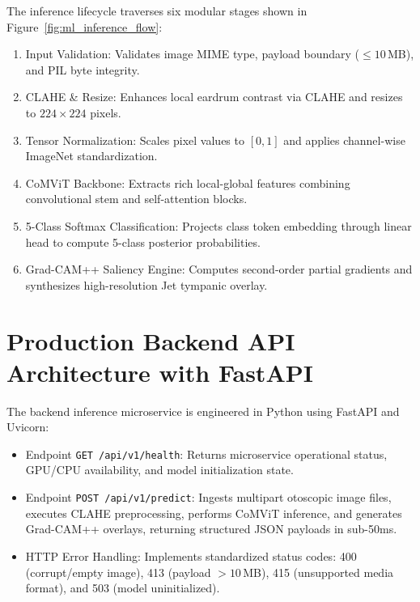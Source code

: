 \documentclass[12pt,a4paper]{report}
\renewcommand{\textbf}[1]{#1}
\begin{document}
The inference lifecycle traverses six modular stages shown in Figure~\ref{fig:ml_inference_flow}:
\begin{enumerate}
    \item \textbf{Input Validation:} Validates image MIME type, payload boundary ($\le 10$\,MB), and PIL byte integrity.
    \item \textbf{CLAHE \& Resize:} Enhances local eardrum contrast via CLAHE and resizes to $224 \times 224$ pixels.
    \item \textbf{Tensor Normalization:} Scales pixel values to $[0, 1]$ and applies channel-wise ImageNet standardization.
    \item \textbf{CoMViT Backbone:} Extracts rich local-global features combining convolutional stem and self-attention blocks.
    \item \textbf{5-Class Softmax Classification:} Projects class token embedding through linear head to compute 5-class posterior probabilities.
    \item \textbf{Grad-CAM++ Saliency Engine:} Computes second-order partial gradients and synthesizes high-resolution Jet tympanic overlay.
\end{enumerate}

\section{Production Backend API Architecture with FastAPI}
The backend inference microservice is engineered in Python using \textbf{FastAPI} and \textbf{Uvicorn}:
\begin{itemize}
    \item \textbf{Endpoint \texttt{GET /api/v1/health}:} Returns microservice operational status, GPU/CPU availability, and model initialization state.
    \item \textbf{Endpoint \texttt{POST /api/v1/predict}:} Ingests multipart otoscopic image files, executes CLAHE preprocessing, performs CoMViT inference, and generates Grad-CAM++ overlays, returning structured JSON payloads in sub-50ms.
    \item \textbf{HTTP Error Handling:} Implements standardized status codes: 400 (corrupt/empty image), 413 (payload $>10$\,MB), 415 (unsupported media format), and 503 (model uninitialized).
\end{itemize}
\end{document}
